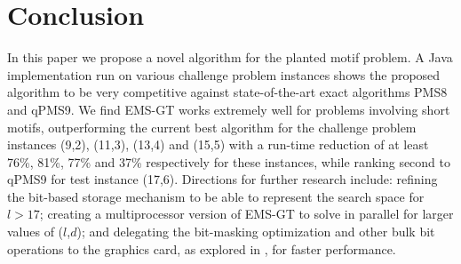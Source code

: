 \documentclass[conference]{IEEEtran}
\begin{document}


\section{Conclusion}
	In this paper we propose a novel algorithm for the planted motif problem. A Java implementation run on various challenge problem instances shows the proposed algorithm to be very competitive against state-of-the-art exact algorithms PMS8 and qPMS9. We find EMS-GT works extremely well for problems involving short motifs, outperforming the current best algorithm for the challenge problem instances (9,2), (11,3), (13,4) and (15,5) with a run-time reduction of at least 76\%, 81\%, 77\% and 37\% respectively for these instances, while ranking second to qPMS9 for test instance (17,6). Directions for further research include: refining the bit-based storage mechanism to be able to represent the search space for $l > 17$; creating a multiprocessor version of EMS-GT to solve in parallel for larger values of ($l$,$d$); and delegating the bit-masking optimization and other bulk bit operations to the graphics card, as explored in \cite{dasari2010efficient}, for faster performance.



\end{document}
